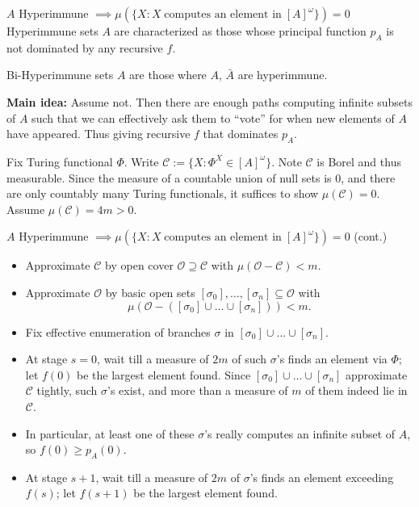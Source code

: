 \documentclass[notes]{beamer}
\begin{document}
\begin{frame}{$A$ Hyperimmune $\implies \mu(\{X: X\; \text{computes an
element in}\; [A]^\omega\}) =0$}
  Hyperimmune sets $A$ are characterized as those whose principal
  function $p_A$ is not dominated by any recursive $f$. \\
  \vspace{1em}

  Bi-Hyperimmune sets $A$ are those where $A$, $\bar{A}$ are hyperimmune.\\
  \vspace{1em}

  \textbf{Main idea:} Assume not. Then there are enough paths computing
  infinite subsets of $A$ such that we can effectively ask them to ``vote''
  for when new elements of $A$ have appeared. Thus giving recursive
  $f$ that dominates $p_A$.\\
  \vspace{1em}

  Fix Turing functional $\Phi$. Write $\mathcal{C} :=\{X:
  \Phi^X\in[A]^\omega\}$. Note $\mathcal{C}$ is Borel and thus measurable.
  Since the measure of a countable union of null sets is 0, and
  there are only countably many Turing functionals, it suffices to show
  $\mu(\mathcal{C})=0$. Assume $\mu(\mathcal{C})=4m>0$.
\end{frame}

\begin{frame}{$A$ Hyperimmune $\implies \mu(\{X: X\; \text{computes an
element in}\; [A]^\omega\}) =0$ (cont.)}
  \begin{itemize}
    \item Approximate $\mathcal{C}$ by open cover
      $\mathcal{O}\supseteq\mathcal{C}$ with
      $\mu(\mathcal{O}-\mathcal{C})<m$.
    \item Approximate $\mathcal{O}$ by basic open sets
      $[\sigma_0],\ldots,[\sigma_n] \subseteq\mathcal{O}$ with
      \[\mu(\mathcal{O}-([\sigma_0]\cup\ldots\cup[\sigma_n])) <m.\]
    \item Fix effective enumeration of branches $\sigma$ in
      $[\sigma_0]\cup\ldots\cup[\sigma_n]$.
    \item At stage $s=0$, wait till a measure of $2m$ of such $\sigma$'s
      finds an element via $\Phi$; let $f(0)$ be the largest element found.
      Since $[\sigma_0]\cup\ldots\cup[\sigma_n]$ approximate $\mathcal{C}$
      tightly, such $\sigma$'s exist, and more than a measure of $m$ of
      them indeed lie in $\mathcal{C}$.
    \item In particular, at least one of these $\sigma$'s really computes
      an infinite subset of $A$, so $f(0)\geq p_A(0)$.
    \item At stage $s+1$, wait till a measure of $2m$ of $\sigma$'s
      finds an element exceeding $f(s)$; let $f(s+1)$ be the largest
      element found.
  \end{itemize}
\end{frame}
\end{document}
